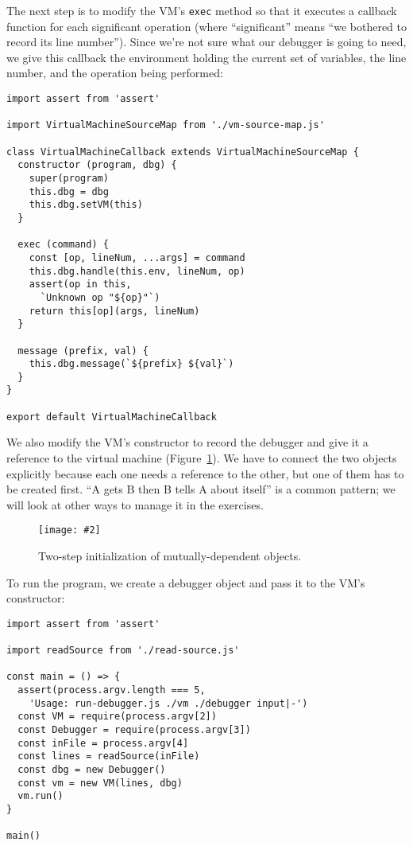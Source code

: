 \documentclass[krantzl]{krantz}
\newcommand{\figpdf}[4]{\begin{figure}%
\centering%
\texttt{[image: \#2]}%
\caption{#3}%
\label{#1}%
\end{figure}}
\newcommand{\figref}[1]{Figure~\ref{#1}}
\begin{document}
The next step is to modify the VM’s \texttt{exec} method
so that it executes a callback function for each significant operation
(where “significant” means “we bothered to record its line number”).
Since we’re not sure what our debugger is going to need,
we give this callback the environment holding the current set of variables,
the line number,
and the operation being performed:


\begin{lstlisting}[frame=tblr]
import assert from 'assert'

import VirtualMachineSourceMap from './vm-source-map.js'

class VirtualMachineCallback extends VirtualMachineSourceMap {
  constructor (program, dbg) {
    super(program)
    this.dbg = dbg
    this.dbg.setVM(this)
  }

  exec (command) {
    const [op, lineNum, ...args] = command
    this.dbg.handle(this.env, lineNum, op)
    assert(op in this,
      `Unknown op "${op}"`)
    return this[op](args, lineNum)
  }

  message (prefix, val) {
    this.dbg.message(`${prefix} ${val}`)
  }
}

export default VirtualMachineCallback
\end{lstlisting}



We also modify the VM’s constructor to record the debugger and give it a reference to the virtual machine
(\figref{debugger-initialization}).
We have to connect the two objects explicitly
because each one needs a reference to the other,
but one of them has to be created first.
“A gets B then B tells A about itself” is a common pattern;
we will look at other ways to manage it in the exercises.

\figpdf{debugger-initialization}{./debugger/initialization.pdf}{Two-step initialization of mutually-dependent objects.}{0.6}


To run the program,
we create a debugger object and pass it to the VM’s constructor:


\begin{lstlisting}[frame=tblr]
import assert from 'assert'

import readSource from './read-source.js'

const main = () => {
  assert(process.argv.length === 5,
    'Usage: run-debugger.js ./vm ./debugger input|-')
  const VM = require(process.argv[2])
  const Debugger = require(process.argv[3])
  const inFile = process.argv[4]
  const lines = readSource(inFile)
  const dbg = new Debugger()
  const vm = new VM(lines, dbg)
  vm.run()
}

main()
\end{lstlisting}
\end{document}
